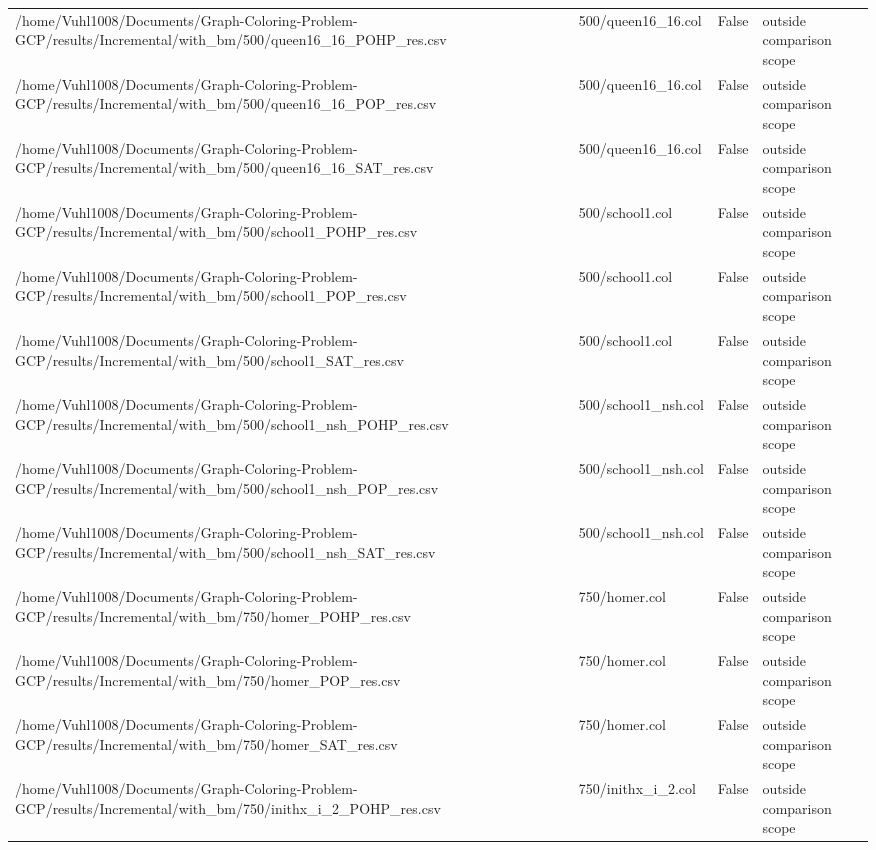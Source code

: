 \begin{table}[htbp]
\begin{tabular}{llll}
/home/Vuhl1008/Documents/Graph-Coloring-Problem-GCP/results/Incremental/with\_bm/500/queen16\_16\_POHP\_res.csv & 500/queen16\_16.col & False & outside comparison scope \\
/home/Vuhl1008/Documents/Graph-Coloring-Problem-GCP/results/Incremental/with\_bm/500/queen16\_16\_POP\_res.csv & 500/queen16\_16.col & False & outside comparison scope \\
/home/Vuhl1008/Documents/Graph-Coloring-Problem-GCP/results/Incremental/with\_bm/500/queen16\_16\_SAT\_res.csv & 500/queen16\_16.col & False & outside comparison scope \\
/home/Vuhl1008/Documents/Graph-Coloring-Problem-GCP/results/Incremental/with\_bm/500/school1\_POHP\_res.csv & 500/school1.col & False & outside comparison scope \\
/home/Vuhl1008/Documents/Graph-Coloring-Problem-GCP/results/Incremental/with\_bm/500/school1\_POP\_res.csv & 500/school1.col & False & outside comparison scope \\
/home/Vuhl1008/Documents/Graph-Coloring-Problem-GCP/results/Incremental/with\_bm/500/school1\_SAT\_res.csv & 500/school1.col & False & outside comparison scope \\
/home/Vuhl1008/Documents/Graph-Coloring-Problem-GCP/results/Incremental/with\_bm/500/school1\_nsh\_POHP\_res.csv & 500/school1\_nsh.col & False & outside comparison scope \\
/home/Vuhl1008/Documents/Graph-Coloring-Problem-GCP/results/Incremental/with\_bm/500/school1\_nsh\_POP\_res.csv & 500/school1\_nsh.col & False & outside comparison scope \\
/home/Vuhl1008/Documents/Graph-Coloring-Problem-GCP/results/Incremental/with\_bm/500/school1\_nsh\_SAT\_res.csv & 500/school1\_nsh.col & False & outside comparison scope \\
/home/Vuhl1008/Documents/Graph-Coloring-Problem-GCP/results/Incremental/with\_bm/750/homer\_POHP\_res.csv & 750/homer.col & False & outside comparison scope \\
/home/Vuhl1008/Documents/Graph-Coloring-Problem-GCP/results/Incremental/with\_bm/750/homer\_POP\_res.csv & 750/homer.col & False & outside comparison scope \\
/home/Vuhl1008/Documents/Graph-Coloring-Problem-GCP/results/Incremental/with\_bm/750/homer\_SAT\_res.csv & 750/homer.col & False & outside comparison scope \\
/home/Vuhl1008/Documents/Graph-Coloring-Problem-GCP/results/Incremental/with\_bm/750/inithx\_i\_2\_POHP\_res.csv & 750/inithx\_i\_2.col & False & outside comparison scope \\

\end{tabular}
\end{table}
